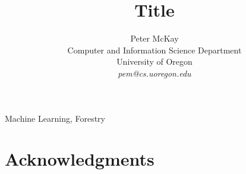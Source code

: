 \documentclass[10pt,twocolumn]{IEEEtran11}
\begin{document}
%


\title{\Large \bf Title
}
\author{
Peter McKay\\
Computer and Information Science Department\\
University of Oregon\\
{\em pem@cs.uoregon.edu}
}
\maketitle


\begin{keywords} 
Machine Learning, Forestry
\end{keywords}









\section{Acknowledgments}



\end{document}
